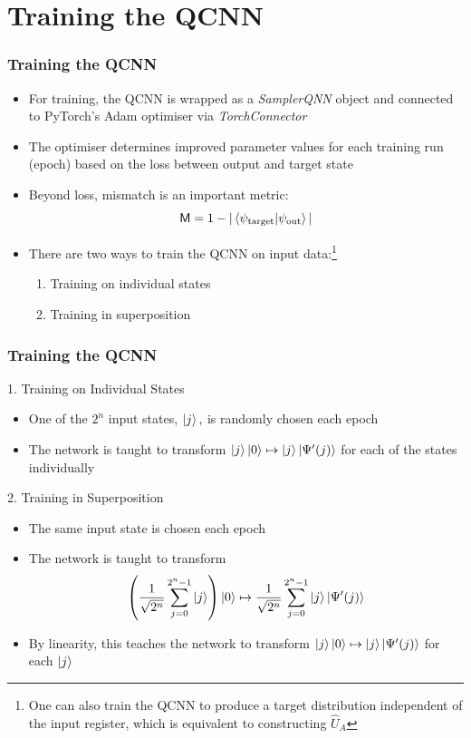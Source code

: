 \documentclass{beamer}
\begin{document}
\section{Training the QCNN}
\begin{frame}
\frametitle{Training the QCNN}
\begin{itemize}
\item For training, the QCNN is wrapped as a \emph{SamplerQNN} object and connected to PyTorch's \alert{Adam optimiser} via \emph{TorchConnector}
\item The optimiser determines improved parameter values for each training run (\alert{epoch}) based on the \alert{loss} between output and target state
\item Beyond loss, \alert{mismatch} is an important metric:
\begin{equation}
\mathsf{M}= 1 - |\braket{\psi_\text{target}| \psi_\text{out}}|
\end{equation}
\item There are two ways to train the QCNN on input data:\footnote{One can also train the QCNN to produce a target distribution independent of the input register, which is equivalent to constructing $\hat{U}_A$}
\begin{enumerate}
\item Training on \alert{individual states}
\item Training in \alert{superposition}
\end{enumerate}
\end{itemize}
\end{frame}

\begin{frame}
\frametitle{Training the QCNN}
\begin{block}{1. Training on Individual States}
\begin{itemize}
\item One of the $2^n$ input states, $\ket{j},$ is \alert{randomly chosen} each epoch
\item The network is taught to transform $\ket{j}\ket{0} \mapsto \ket{j}\ket{\Psi'(j)} $ for each of the states individually
\end{itemize} 
\end{block}
\begin{block}{2. Training in Superposition}
\begin{itemize}
\item The \alert{same input state} is chosen each epoch
\item The network is taught to transform 
\begin{equation}
\left(\frac{1}{\sqrt{2^n}} \sum^{2^n-1}_{j=0} \ket{j} \right) \ket{0} \mapsto \frac{1}{\sqrt{2^n}} \sum^{2^n -1}_{j=0} \ket{j}\ket{\Psi'(j)}
\end{equation}
\item By linearity, this teaches the network to transform $\ket{j}\ket{0} \mapsto \ket{j}\ket{\Psi'(j)} $ for each $\ket{j}$
\end{itemize} 
\end{block}
\end{frame}
\end{document}
